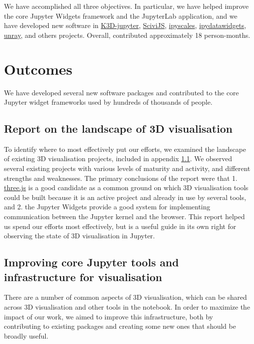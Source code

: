 \documentclass{deliverablereport}
\begin{document}
We have accomplished all three objectives. In particular, we have helped improve the
core Jupyter Widgets framework and the JupyterLab application, and we have
developed new software in
\href{https://github.com/K3D-tools/K3D-jupyter}{K3D-jupyter},
\href{https://demo.logilab.fr/SciviJS/}{SciviJS},
\href{https://github.com/vidartf/ipyscales}{ipyscales},
\href{https://github.com/vidartf/ipydatawidgets}{ipydatawidgets},
\href{https://github.com/vidartf/unray}{unray},
and others projects.
Overall, \ODK contributed approximately 18 person-months.



\section{Outcomes}

We have developed several new software packages and contributed to the core Jupyter widget frameworks used by hundreds of thousands of people.

\subsection{Report on the landscape of 3D visualisation}\label{landscape}

To identify where to most effectively put our efforts,
we examined the landscape of existing 3D visualisation projects,
included in appendix \ref{landscape}.
We observed several existing projects with various levels of maturity and activity, and different strengths and weaknesses.
The primary conclusions of the report were that 1. \href{https://threejs.org}{three.js} is a good candidate as a common ground on which 3D visualisation tools could be built because it is an active project and already in use by several tools, and 2. the Jupyter Widgets provide a good system for implementing communication between the Jupyter kernel and the browser.
This report helped us spend our efforts most effectively,
but is a useful guide in its own right for observing the state
of 3D visualisation in Jupyter.


\subsection{Improving core Jupyter tools and infrastructure for visualisation}\label{improving-core}

There are a number of common aspects of 3D visualisation,
which can be shared across 3D visualisation and other tools
in the notebook.
In order to maximize the impact of our work,
we aimed to improve this infrastructure,
both by contributing to existing packages and creating some new ones
that should be broadly useful.
\end{document}
